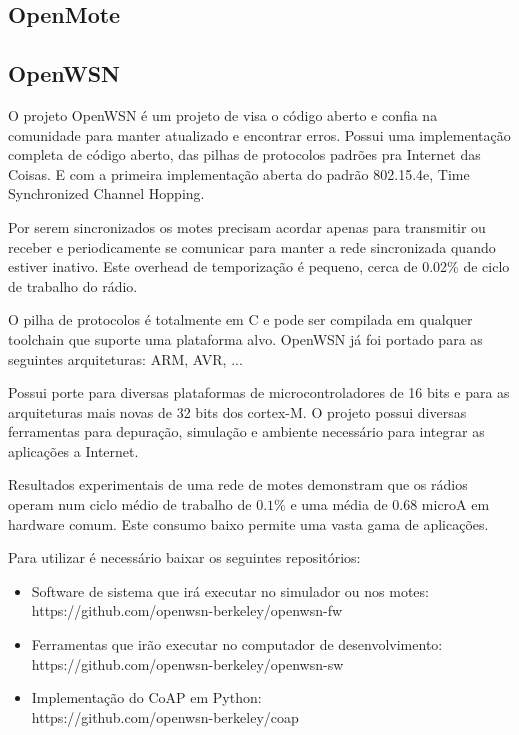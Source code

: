 \subsection{OpenMote}

\subsection{OpenWSN}

O projeto OpenWSN \'e um projeto de visa o c\'odigo aberto e confia na comunidade para manter atualizado e encontrar erros. Possui uma implementa\c{c}\~ao completa de c\'odigo aberto, das pilhas de protocolos padr\~oes pra Internet das Coisas. E com a primeira implementa\c{c}\~ao aberta do padr\~ao 802.15.4e, Time Synchronized Channel Hopping.

Por serem sincronizados os motes precisam acordar apenas para transmitir ou receber e periodicamente se comunicar para manter a rede sincronizada quando estiver inativo. Este overhead de temporiza\c{c}\~ao \'e pequeno, cerca de 0.02\% de ciclo de trabalho do r\'adio. \cite{openWSNPaper}

O pilha de protocolos \'e totalmente em C e pode ser compilada em qualquer toolchain que suporte uma plataforma alvo. OpenWSN j\'a foi portado para as seguintes arquiteturas: ARM, AVR, ...

Possui porte para diversas plataformas de microcontroladores de 16 bits e para as arquiteturas mais novas de 32 bits dos cortex-M. O projeto possui diversas ferramentas para depura\c{c}\~ao, simula\c{c}\~ao e ambiente necess\'ario para integrar as aplica\c{c}\~oes a Internet.\cite{openWSN}

Resultados experimentais de uma rede de motes demonstram que os r\'adios operam num ciclo m\'edio de trabalho de $0.1\%$ e uma m\'edia de 0.68 microA em hardware comum. Este consumo baixo permite uma vasta gama de aplica\c{c}\~oes.

Para utilizar \'e necess\'ario baixar os seguintes reposit\'orios:
\begin{itemize}
    \item Software de sistema que ir\'a executar no simulador ou nos motes:\\https://github.com/openwsn-berkeley/openwsn-fw
    \item Ferramentas que ir\~ao executar no computador de desenvolvimento:\\https://github.com/openwsn-berkeley/openwsn-sw 
    \item Implementa\c{c}\~ao do CoAP em Python:\\https://github.com/openwsn-berkeley/coap
\end{itemize}


